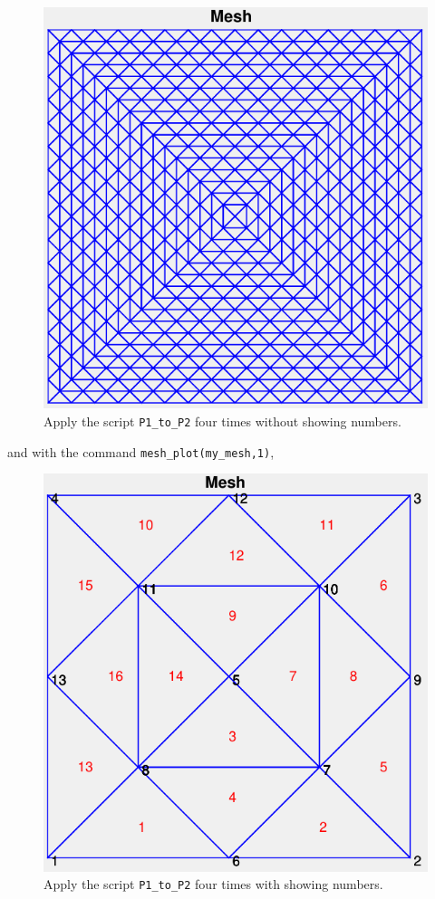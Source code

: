 \documentclass[11pt,a4paper,center,notitlepage]{article}
\numberwithin{equation}{section}
\begin{document}
\begin{figure}[H]
\centering
\includegraphics[scale=0.6]{5}
\caption{Apply the script \texttt{P1\_to\_P2} four times without showing numbers.}
\label{fig5}
\end{figure}
and with the command \verb|mesh_plot(my_mesh,1)|,
\begin{figure}[H]
\centering
\includegraphics[scale=0.6]{6}
\caption{Apply the script \texttt{P1\_to\_P2} four times with showing numbers.}
\label{fig6}
\end{figure}
\end{document}
